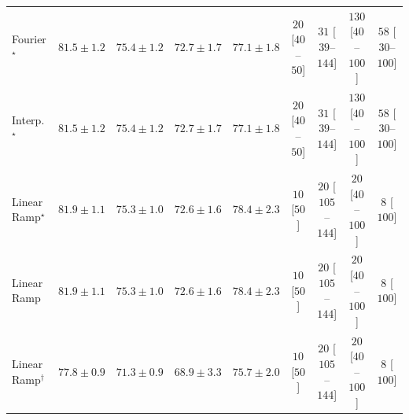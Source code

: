 \begin{tabular}{l|cccc|cccc|}
Fourier$^\star$ & {\cellcolor[HTML]{004A2B}} \color[HTML]{F1F1F1} $81.5\pm 1.2$ & {\cellcolor[HTML]{2C8F4B}} \color[HTML]{F1F1F1} $75.4\pm 1.2$ & {\cellcolor[HTML]{4EB163}} \color[HTML]{F1F1F1} $72.7\pm 1.7$ & {\cellcolor[HTML]{187B3F}} \color[HTML]{F1F1F1} $77.1\pm 1.8$ & {\cellcolor[HTML]{FFF4F0}} \color[HTML]{000000} $20$ [$40$--$50$] & {\cellcolor[HTML]{FFF2EE}} \color[HTML]{000000} $31$ [$39$--$144$] & {\cellcolor[HTML]{FDDBD7}} \color[HTML]{000000} $130$ [$40$--$100$] & {\cellcolor[HTML]{FEECE9}} \color[HTML]{000000} $58$ [$30$--$100$] \\
Interp.$^\star$ & {\cellcolor[HTML]{004A2B}} \color[HTML]{F1F1F1} $81.5\pm 1.2$ & {\cellcolor[HTML]{2C8F4B}} \color[HTML]{F1F1F1} $75.4\pm 1.2$ & {\cellcolor[HTML]{4EB163}} \color[HTML]{F1F1F1} $72.7\pm 1.7$ & {\cellcolor[HTML]{187B3F}} \color[HTML]{F1F1F1} $77.1\pm 1.8$ & {\cellcolor[HTML]{FFF4F0}} \color[HTML]{000000} $20$ [$40$--$50$] & {\cellcolor[HTML]{FFF2EE}} \color[HTML]{000000} $31$ [$39$--$144$] & {\cellcolor[HTML]{FDDBD7}} \color[HTML]{000000} $130$ [$40$--$100$] & {\cellcolor[HTML]{FEECE9}} \color[HTML]{000000} $58$ [$30$--$100$] \\
Linear Ramp$^\star$ & {\cellcolor[HTML]{004629}} \color[HTML]{F1F1F1} $81.9\pm 1.1$ & {\cellcolor[HTML]{2D914B}} \color[HTML]{F1F1F1} $75.3\pm 1.0$ & {\cellcolor[HTML]{4FB264}} \color[HTML]{F1F1F1} $72.6\pm 1.6$ & {\cellcolor[HTML]{096F3A}} \color[HTML]{F1F1F1} $78.4\pm 2.3$ & {\cellcolor[HTML]{FFF7F3}} \color[HTML]{000000} $10$ [$50$] & {\cellcolor[HTML]{FFF4F0}} \color[HTML]{000000} $20$ [$105$--$144$] & {\cellcolor[HTML]{FFF4F0}} \color[HTML]{000000} $20$ [$40$--$100$] & {\cellcolor[HTML]{FFF7F3}} \color[HTML]{000000} $8$ [$100$] \\
Linear Ramp & {\cellcolor[HTML]{004629}} \color[HTML]{F1F1F1} $81.9\pm 1.1$ & {\cellcolor[HTML]{2D914B}} \color[HTML]{F1F1F1} $75.3\pm 1.0$ & {\cellcolor[HTML]{4FB264}} \color[HTML]{F1F1F1} $72.6\pm 1.6$ & {\cellcolor[HTML]{096F3A}} \color[HTML]{F1F1F1} $78.4\pm 2.3$ & {\cellcolor[HTML]{FFF7F3}} \color[HTML]{000000} $10$ [$50$] & {\cellcolor[HTML]{FFF4F0}} \color[HTML]{000000} $20$ [$105$--$144$] & {\cellcolor[HTML]{FFF4F0}} \color[HTML]{000000} $20$ [$40$--$100$] & {\cellcolor[HTML]{FFF7F3}} \color[HTML]{000000} $8$ [$100$] \\
Linear Ramp$^\dagger$ & {\cellcolor[HTML]{10743C}} \color[HTML]{F1F1F1} $77.8\pm 0.9$ & {\cellcolor[HTML]{69BF72}} \color[HTML]{000000} $71.3\pm 0.9$ & {\cellcolor[HTML]{95D385}} \color[HTML]{000000} $68.9\pm 3.3$ & {\cellcolor[HTML]{298C48}} \color[HTML]{F1F1F1} $75.7\pm 2.0$ & {\cellcolor[HTML]{FFF7F3}} \color[HTML]{000000} $10$ [$50$] & {\cellcolor[HTML]{FFF4F0}} \color[HTML]{000000} $20$ [$105$--$144$] & {\cellcolor[HTML]{FFF4F0}} \color[HTML]{000000} $20$ [$40$--$100$] & {\cellcolor[HTML]{FFF7F3}} \color[HTML]{000000} $8$ [$100$] \\

\end{tabular}
